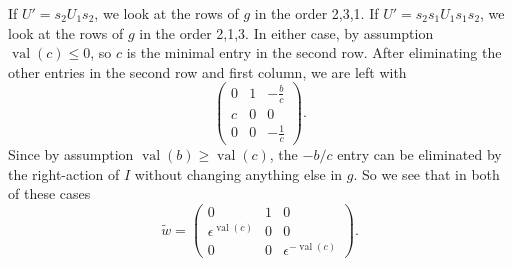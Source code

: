 \documentclass{amsart}
\theoremstyle{definition}
\def\e{\epsilon}
\def\w{\widetilde{w}}
\def\val{\mathop{\mathrm{val}}}
\begin{document}
  If $U' = s_2 U_1 s_2$, we look at the rows of $g$ in the order 2,3,1.  If $U'
  = s_2s_1 U_1 s_1s_2$, we look at the rows of $g$ in the order 2,1,3.  In
  either case, by assumption $\val(c) \le 0$, so $c$ is the minimal entry in
  the second row.  After eliminating the other entries in the second row and
  first column, we are left with
  \begin{equation}\label{eq:w5-row2}
    \begin{pmatrix}
      0 & 1 & -\frac{b}{c} \\
      c & 0 & 0 \\
      0 & 0 & -\frac{1}{c}
    \end{pmatrix}.
  \end{equation}
  Since by assumption $\val(b) \ge \val(c)$, the $-b/c$ entry can be eliminated
  by the right-action of $I$ without changing anything else in $g$.  So we see
  that in both of these cases 
  \begin{equation*}
    \w = \begin{pmatrix}
      0 & 1 & 0 \\
      \e^{\val(c)} & 0 & 0 \\
      0 & 0 & \e^{-\val(c)}
    \end{pmatrix}.
  \end{equation*}
\end{document}
